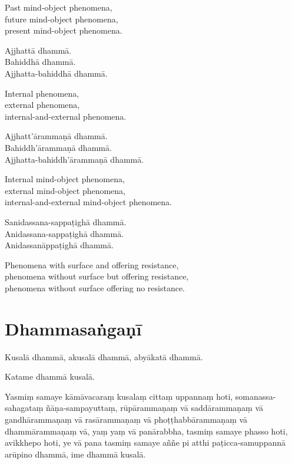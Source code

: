 \clearpage

\begin{english}
  Past mind-object phenomena,\\
  future mind-object phenomena,\\
  present mind-object phenomena.
\end{english}

Ajjhattā dhammā.\\
Bahiddhā dhammā.\\
Ajjhatta-bahiddhā dhammā.

\begin{english}
  Internal phenomena,\\
  external phenomena,\\
  internal-and-external phenomena.
\end{english}

Ajjhatt'ārammaṇā dhammā.\\
Bahiddh'ārammaṇā dhammā.\\
Ajjhatta-bahiddh'ārammaṇā dhammā.

\begin{english}
  Internal mind-object phenomena,\\
  external mind-object phenomena,\\
  internal-and-external mind-object phenomena.
\end{english}

Sanidassana-sappaṭighā dhammā.\\
Anidassana-sappaṭighā dhammā.\\
Anidassanāppaṭighā dhammā.

\begin{english}
  Phenomena with surface and offering resistance,\\
  phenomena without surface but offering resistance,\\
  phenomena without surface offering no resistance.
\end{english}


\clearpage

\section{Dhammasaṅgaṇī}

Kusalā dhammā, akusalā dhammā, abyākatā dhammā.

Katame dhammā kusalā.

Yasmiṃ samaye kāmāvacaraṃ kusalaṃ cittaṃ uppannaṃ hoti, somanassa-sahagataṃ
ñāṇa-sampayuttaṃ, rūpārammaṇaṃ vā saddārammaṇaṃ vā gandhārammaṇaṃ vā
rasārammaṇaṃ vā phoṭṭhabbārammaṇaṃ vā dhammārammaṇaṃ vā, yaṃ yaṃ vā panārabbha,
tasmiṃ samaye phasso hoti, avikkhepo hoti, ye vā pana tasmiṃ samaye aññe pi atthi paṭicca-samuppannā arūpino dhammā, ime dhammā kusalā.

